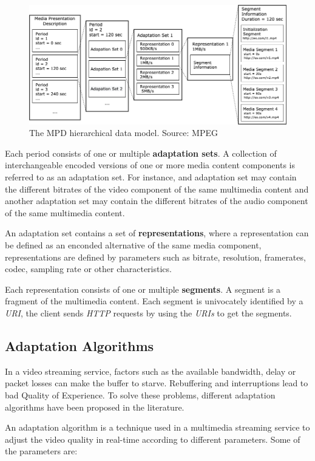 \begin{figure}[h]
  \centering
  \includegraphics[width=\textwidth]{img/mpd.png}
  \caption{The MPD hierarchical data model. Source: MPEG \cite{ios1}}
  \label{fig:mpd}
\end{figure}

Each period consists of one or multiple \textbf{adaptation sets}. A collection of interchangeable 
encoded versions of one or more media content components is referred to as an adaptation set. For instance,
and adaptation set may contain the different bitrates of the video component of the same multimedia content
and another adaptation set may contain the different bitrates of the audio component of the same multimedia
content.

An adaptation set contains a set of \textbf{representations}, where a representation can be defined as an enconded
alternative of the same media component, representations are defined by parameters such as
bitrate, resolution, framerates, codec, sampling rate or other characteristics.

Each representation consists of one or multiple \textbf{segments}. A segment is a fragment of 
the multimedia content. Each segment is univocately identified by a \textit{URI}, the client 
sends \textit{HTTP} requests by using the \textit{URIs} to get the segments.


\subsection{Adaptation Algorithms}
\label{sec:adap}

In a video streaming service, factors such as the available bandwidth, delay or packet losses
can make the buffer to starve. Rebuffering and interruptions 
lead to bad Quality of Experience. To solve these problems, 
different adaptation algorithms have been proposed in the literature.

An adaptation algorithm is a technique used in a multimedia streaming service to adjust the video quality
in real-time according to different parameters. Some of the parameters are:

